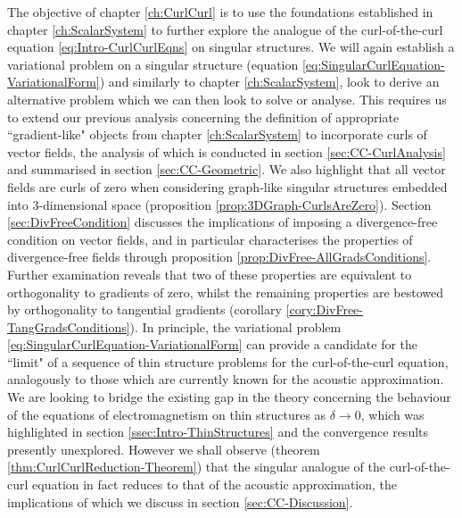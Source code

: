 The objective of chapter \ref{ch:CurlCurl} is to use the foundations established in chapter \ref{ch:ScalarSystem} to further explore the analogue of the curl-of-the-curl equation \eqref{eq:Intro-CurlCurlEqns} on singular structures.
We will again establish a variational problem on a singular structure (equation \eqref{eq:SingularCurlEquation-VariationalForm}) and similarly to chapter \ref{ch:ScalarSystem}, look to derive an alternative problem which we can then look to solve or analyse.
This requires us to extend our previous analysis concerning the definition of appropriate ``gradient-like" objects from chapter \ref{ch:ScalarSystem} to incorporate curls of vector fields, the analysis of which is conducted in section \ref{sec:CC-CurlAnalysis} and summarised in section \ref{sec:CC-Geometric}.
We also highlight that all vector fields are curls of zero when considering graph-like singular structures embedded into 3-dimensional space (proposition \ref{prop:3DGraph-CurlsAreZero}).
Section \ref{sec:DivFreeCondition} discusses the implications of imposing a divergence-free condition on vector fields, and in particular characterises the properties of divergence-free fields through proposition \ref{prop:DivFree-AllGradsConditions}.
Further examination reveals that two of these properties are equivalent to orthogonality to gradients of zero, whilst the remaining properties are bestowed by orthogonality to tangential gradients (corollary \ref{cory:DivFree-TangGradsConditions}).
In principle, the variational problem \eqref{eq:SingularCurlEquation-VariationalForm} can provide a candidate for the ``limit" of a sequence of thin structure problems for the curl-of-the-curl equation, analogously to those which are currently known for the acoustic approximation.
We are looking to bridge the existing gap in the theory concerning the behaviour of the equations of electromagnetism on thin structures as $\delta\rightarrow0$, which was highlighted in section \ref{ssec:Intro-ThinStructures} and the convergence results presently unexplored.
However we shall observe (theorem \ref{thm:CurlCurlReduction-Theorem}) that the singular analogue of the curl-of-the-curl equation in fact reduces to that of the acoustic approximation, the implications of which we discuss in section \ref{sec:CC-Discussion}.

